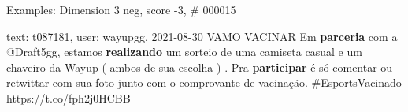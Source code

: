 \begin{frame}{Examples: Dimension 3 neg, score -3, \# 000015}
\footnotesize
\begin{alertblock}{text: t087181, user: wayupgg, 2021-08-30}
VAMO VACINAR  Em \textbf{parceria} com a @Draft5gg, estamos 
\textbf{realizando} um sorteio de uma camiseta casual e um chaveiro da Wayup ( 
ambos de sua escolha ) . Pra \textbf{participar} é só comentar ou retwittar com 
sua foto junto com o comprovante de vacinação. \#EsportsVacinado 
https://t.co/fph2j0HCBB 
\end{alertblock}
\end{frame}
